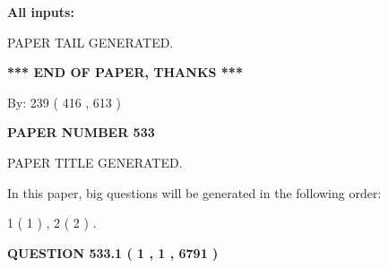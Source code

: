 \documentclass[12pt]{article}
\begin{document}
   
   
   
\noindent{}
   
   
   
   
\noindent\vspace{0.1in}\hspace{-0.08in} {\textbf{\Large{All inputs: }}}
   
   
   
   
   
   
 \vspace{0.2in}
 
   
   
\vspace{2.0in} PAPER TAIL GENERATED.
   
   
   
   
\vspace{1.0in} 
{\textbf{\large{ *** END OF PAPER, THANKS *** }}} 
   
   
\hspace{1.0in} By: 
 239 ( 416 ,  613 )
   
   
   
   
\newpage 
\setcounter{page}{ 
   533001 } 
   
   
   
   
 {\textbf{ \Large{ PAPER NUMBER  533  }}}
   
   
\vspace{0.2in}
   
   
   
   
   
   
   
   
 \vspace{0.2in}
 
 
 
 
   
   
 PAPER TITLE GENERATED.
   
   
   
\vspace{0.2in}
   
In this paper, big questions will be generated in the following order: 
   
   
   1 ( 1 )
 ,
   2 ( 2 )
 .
  
\vspace{0.2in}
  
{\textbf{\Large{QUESTION
533.1 
 ( 1 , 1 , 6791 )
}}}
  
\end{document}
